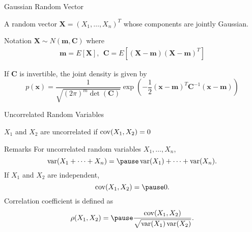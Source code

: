 \documentclass[t]{beamer}
\newcommand{\cov}{\operatornamewithlimits{cov}}
\newcommand{\var}{\operatornamewithlimits{var}}
\begin{document}
\begin{frame}{Gaussian Random Vector}
  \footnotesize
  \pause
  \begin{definition}
  A random vector $\mathbf{X} = (X_1,  \ldots,  X_n)^T$ whose components are jointly Gaussian.
  \end{definition}
  \pause
  \begin{block}{Notation}
  $\mathbf{X} \sim N(\mathbf{m},\mathbf{C})$ where 
  \begin{eqnarray*}
  \mathbf{m} = E[\mathbf{X}], \ \  \mathbf{C} = E\left[ (\mathbf{X}-\mathbf{m})(\mathbf{X}-\mathbf{m})^T\right]
  \end{eqnarray*}
  \end{block}
  \pause
  \begin{definition}
  If $\mathbf{C}$ is invertible, the joint density is given by
    \begin{equation*}
      p(\mathbf{x}) = \frac{1}{\sqrt{(2\pi)^m\det(\mathbf{C})}} \exp\left(-\frac{1}{2} (\mathbf{x}-\mathbf{m})^T\mathbf{C}^{-1}(\mathbf{x}-\mathbf{m})\right)
    \end{equation*}
  \end{definition}
  \normalsize
\end{frame}

\begin{frame}{Uncorrelated Random Variables}
  \footnotesize
  \pause
  \begin{definition}[]
  $X_1$ and $X_2$ are uncorrelated if $\cov(X_1,X_2) = 0$
  \end{definition}
  \pause
  \begin{block}{Remarks}
    For uncorrelated random variables $X_1,\ldots,X_n$,
      \begin{equation*}
        \var(X_1+\cdots+X_n) = \pause \var(X_1)+\cdots+\var(X_n).
      \end{equation*}
    \pause
    If $X_1$ and $X_2$ are independent,
      \begin{equation*}
        \cov(X_1,X_2) = \pause 0.
      \end{equation*}
    \pause
    Correlation coefficient is defined as
      \begin{equation*}
        \rho(X_1,X_2) = \pause \frac{\cov(X_1,X_2)}{\sqrt{\var(X_1)\var(X_2)}}.
      \end{equation*}
  \end{block}
  \normalsize
\end{frame}
\end{document}
